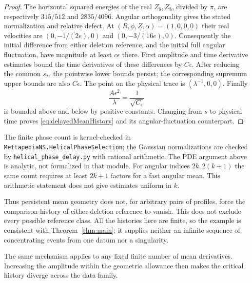 \documentclass[11pt]{article}
\theoremstyle{remark}
\begin{document}
\begin{proof}
The horizontal squared energies of the real $Z_6,Z_8$, divided by
$\pi$, are respectively $315/512$ and $2835/4096$. Angular
orthogonality gives the stated normalization and relative defect.
At $(R,\phi,Z,\alpha)=(1,0,0,0)$ their real velocities are
$(0,-1/(2e),0)$ and $(0,-3/(16e),0)$.
Consequently the initial difference from either deletion reference,
and the initial full angular fluctuation, have magnitude at least
$c\epsilon$ there. First amplitude and time derivative estimates
bound the time derivatives of these differences by $C\epsilon$.
After reducing the common $s_*$, the pointwise lower bounds persist;
the corresponding supremum upper bounds are also $C\epsilon$.
The point on the physical trace is $(\lambda^{-1},0,0)$.
Finally
\[
 \frac{A\epsilon^2}{\lambda}=\frac1{\sqrt{C_\epsilon}}
\]
is bounded above and below by positive constants. Changing from $s$
to physical time proves \eqref{eq:delayedMeanHistory} and its
angular-fluctuation counterpart.
\end{proof}

The finite phase count is kernel-checked in
\texttt{MettapediaNS.HelicalPhaseSelection}; the Gaussian normalizations
are checked by \texttt{helical\_phase\_delay.py} with rational arithmetic.
The PDE argument above is analytic, not formalized in that module.
For angular indices $2k,2(k+1)$ the same count requires at least
$2k+1$ factors for a fast angular mean. This arithmetic statement
does not give estimates uniform in $k$.

Thus persistent mean geometry does not, for arbitrary pairs of profiles,
force the comparison history of either deletion reference to vanish.
This does not exclude every possible reference class. All the histories
here are finite, so the example is consistent with
Theorem~\ref{thm:main}; it supplies neither an infinite sequence of
concentrating events from one datum nor a singularity.

The same mechanism applies to any fixed finite number of mean
derivatives. Increasing the amplitude within the geometric allowance
then makes the critical history diverge across the data family.
\end{document}
